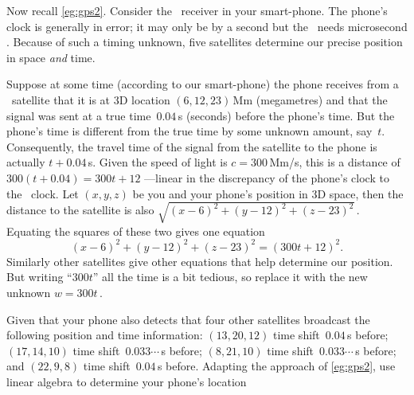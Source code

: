 \begin{example} \label{eg:gps3t}
Now recall \cref{eg:gps2}.
Consider the \gps\ receiver in your smart-phone.
The phone's clock is generally in error; it may only be by a second but the \gps\ needs microsecond . 
Because of such a timing unknown, five satellites determine our precise position in space \emph{and} time.

Suppose at some time (according to our smart-phone) the phone receives from a \gps\ satellite that it is at 3D location \((6,12,23)\)\,Mm (megametres) and that the signal was sent at a true time~\(0.04\)\,s (seconds) before the phone's time.
But the phone's time is different from the true time by some unknown amount, say~\(t\).
Consequently, the travel time of the signal from the satellite to the phone is actually \(t+0.04\)\,s.
Given the speed of light is \(c=300\)\,Mm/s, this is a distance of \(300(t+0.04)=300t+12\) ---linear in the discrepancy of the phone's clock to the \gps\ clock.
Let \((x,y,z)\) be you and your phone's position in 3D space, then the distance to the satellite is also \(\sqrt{(x-6)^2+(y-12)^2+(z-23)^2}\)\,.
Equating the squares of these two gives one equation
\begin{equation*}
(x-6)^2+(y-12)^2+(z-23)^2=(300t+12)^2.
\end{equation*}
Similarly other satellites give other equations that help determine our position.
But writing ``\(300t\)'' all the time is a bit tedious, so replace it with the new unknown \(w=300t\)\,.

Given that your phone also detects that four other satellites broadcast the following position and time information:
\((13,20,12)\) time shift~\(0.04\)\,s before;
\((17,14,10)\) time shift~\(0.033\cdots\)\,s before;
\((8,21,10)\) time shift~\(0.033\cdots\)\,s before; and
\((22,9,8)\) time shift~\(0.04\)\,s before.
Adapting the approach of \cref{eg:gps2}, use linear algebra to determine your phone's location 


\end{example}
